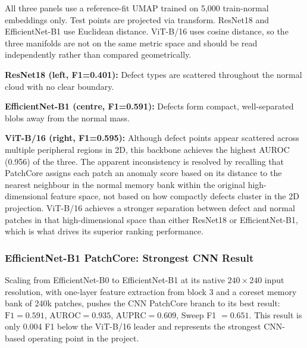 \documentclass[11pt]{article}
\begin{document}
All three panels use a reference-fit UMAP trained on 5,000 train-normal embeddings only. Test points are projected via transform. ResNet18 and EfficientNet-B1 use Euclidean distance. ViT-B/16 uses cosine distance, so the three manifolds are not on the same metric space and should be read independently rather than compared geometrically.

\textbf{ResNet18 (left, F1=0.401):} Defect types are scattered throughout the normal cloud with no clear boundary.

\textbf{EfficientNet-B1 (centre, F1=0.591):} Defects form compact, well-separated blobs away from the normal mass.

\textbf{ViT-B/16 (right, F1=0.595):} Although defect points appear scattered across multiple peripheral regions in 2D, this backbone achieves the highest AUROC (0.956) of the three. The apparent inconsistency is resolved by recalling that PatchCore assigns each patch an anomaly score based on its distance to the nearest neighbour in the normal memory bank within the original high-dimensional feature space, not based on how compactly defects cluster in the 2D projection. ViT-B/16 achieves a stronger separation between defect and normal patches in that high-dimensional space than either ResNet18 or EfficientNet-B1, which is what drives its superior ranking performance.

\subsubsection{EfficientNet-B1 PatchCore: Strongest CNN Result}

Scaling from EfficientNet-B0 to EfficientNet-B1 at its native
$240\!\times\!240$ input resolution, with one-layer feature extraction from
block 3 and a coreset memory bank of 240k patches, pushes the CNN PatchCore
branch to its best result: $\mathrm{F1}=0.591$, $\mathrm{AUROC}=0.935$,
$\mathrm{AUPRC}=0.609$, Sweep F1 $=0.651$. This result is only 0.004 F1
below the ViT-B/16 leader and represents the strongest CNN-based
operating point in the project.
\end{document}
